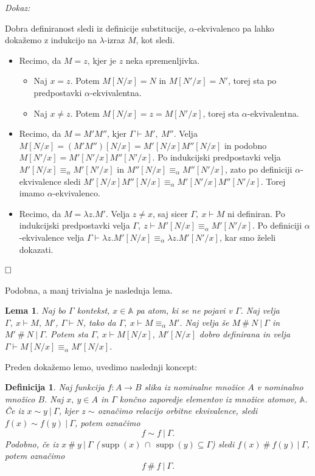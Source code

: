 \documentclass{article}
\DeclareMathOperator{\supp}{supp}
\def\qed{$\hfill\Box$}   %
\newtheorem{lema}{Lema}
\newtheorem{definicija}{Definicija}
\begin{document}
\noindent
{\em Dokaz:\/}

Dobra definiranost sledi iz definicije substitucije,
\(\alpha\)-ekvivalenco pa lahko dokažemo z indukcijo na \(\lambda\)-izraz \(M\), kot sledi.

\begin{itemize}
    \item Recimo, da \(M = z\), kjer je \(z\) neka spremenljivka. 
        \begin{itemize}
            \item Naj \(x = z\). Potem \(M[N/x] = N\) in \(M[N'/x] = N'\), torej sta po predpostavki \(\alpha\)-ekvivalentna.
            \item Naj \(x \neq z\). Potem \(M[N/x] = z = M[N'/x]\), torej sta \(\alpha\)-ekvivalentna.
        \end{itemize}

    \item Recimo, da \(M = M'M''\), kjer \(\Gamma \vdash M',\ M''\). Velja \(M[N/x] = (M'M'')[N/x] = M'[N/x]M''[N/x]\) in podobno \(M[N'/x] = M'[N'/x]M''[N'/x]\). Po indukcijski predpostavki velja \(M'[N/x] \equiv_\alpha M'[N'/x]\) in \(M''[N/x] \equiv_\alpha M''[N'/x]\), zato po definiciji \(\alpha\)-ekvivalence sledi \(M'[N/x]M''[N/x] \equiv_\alpha M'[N'/x]M''[N'/x]\). Torej imamo \(\alpha\)-ekvivalenco.

    \item Recimo, da \(M = \lambda z. M'\). Velja \(z \neq x\), saj sicer \(\Gamma,\ x \vdash M\) ni definiran. Po indukcijski predpostavki velja \(\Gamma,\ z \vdash M'[N/x] \equiv_\alpha M'[N'/x]\). Po definiciji \(\alpha\)-ekvivalence velja \(\Gamma \vdash \lambda z.M'[N/x] \equiv_\alpha \lambda z.M'[N'/x]\), kar smo želeli dokazati.
\end{itemize}
\qed

Podobna, a manj trivialna je naslednja lema.

\begin{lema}
    Naj bo \(\Gamma\) kontekst, \(x \in \mathds{A}\) pa atom, ki se ne pojavi v \(\Gamma\). Naj velja \(\Gamma,\ x \vdash M,\ M'\), \(\Gamma \vdash N\), tako da \(\Gamma,\ x \vdash M \equiv_\alpha M'\). Naj velja še \(M \ \#\ N \ \vert\ \Gamma\) in \(M' \ \#\ N \ \vert\ \Gamma\). Potem sta \(\Gamma,\ x \vdash M[N/x],\ M'[N/x]\) dobro definirana in velja \(\Gamma \vdash M[N/x] \equiv_\alpha M'[N/x]\).
\end{lema}

Preden dokažemo lemo, uvedimo naslednji koncept:

\begin{definicija}
    Naj funkcija \(f : A \rightarrow B\) slika iz nominalne množice \(A\) v nominalno množico \(B\). Naj \(x,\ y \in A\) in \(\Gamma\) končno zaporedje elementov iz množice atomov, \(\mathds{A}\). Če iz \(x \sim y \ \vert\ \Gamma\), kjer z \(\sim\) označimo relacijo orbitne ekvivalence, sledi \(f(x) \sim f(y) \ \vert\ \Gamma\), potem označimo
    \[
        f \sim f \ \vert\ \Gamma.
    \]
    Podobno, če iz \(x \ \#\ y \ \vert\ \Gamma\) (\(\supp(x)\, \cap\, \supp(y) \subseteq \Gamma\)) sledi \(f(x) \ \#\ f(y) \ \vert\ \Gamma\), potem označimo
    \[
        f \ \#\ f \ \vert\ \Gamma.
    \]
\end{definicija}
\end{document}
